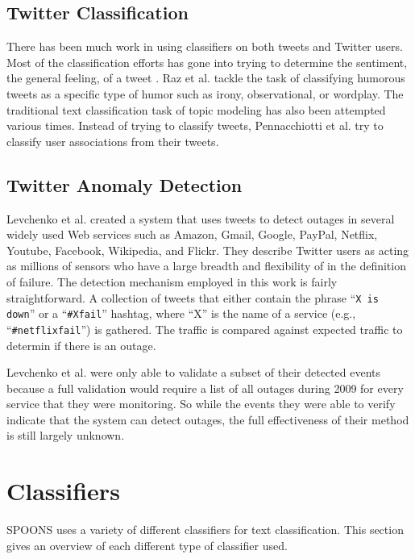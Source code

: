 \documentclass[12pt]{ucthesis}
\begin{document}
\subsection{Twitter Classification}
\label{background-twitter-classification}
There has been much work in using classifiers on both tweets and Twitter users.
Most of the classification efforts has gone into trying to determine the sentiment,
the general feeling, of a tweet \cite{Jiang}\cite{Mukherjee}\cite{Saif}\cite{Wang}.
Raz et al. tackle the task of classifying humorous tweets as a specific type of humor
such as irony, observational, or wordplay\cite{Raz}.
The traditional text classification task of topic modeling has also been attempted various times\cite{hong}\cite{Zhao}.
Instead of trying to classify tweets, Pennacchiotti et al. try to classify user associations from
their tweets\cite{Pennacchiotti}.

\subsection{Twitter Anomaly Detection}
\label{background-twitter-anomaly}
Levchenko et al.\cite{levchenko} created a system that uses tweets to detect outages in several widely used Web services such as Amazon, Gmail, Google, PayPal, Netflix, Youtube, Facebook, Wikipedia, and Flickr.
They describe Twitter users as acting as millions of sensors who have a large breadth and flexibility of in the definition of failure.
The detection mechanism employed in this work is fairly straightforward.
A collection of tweets that either contain the phrase ``\texttt{X is down}'' or a ``\texttt{\#Xfail}'' hashtag, where ``X'' is the name of a service (e.g., ``\texttt{\#netflixfail}'') is gathered.
The traffic is compared against expected traffic to determin if there is an outage.

Levchenko et al. were only able to validate a subset of their detected events because a full validation would require a list of all outages during 2009 for every service that they were monitoring.
So while the events they were able to verify indicate that the system can detect outages, the full effectiveness of their method is still largely unknown.

\section{Classifiers}
\label{background-classifiers}
SPOONS uses a variety of different classifiers for text classification.
This section gives an overview of each different type of classifier used.
\end{document}
